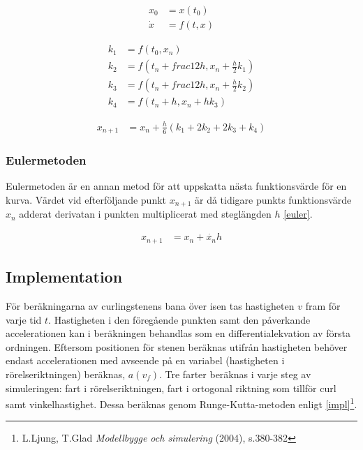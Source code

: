 \documentclass[11pt]{article} %
\begin{document}
 \begin{subequations}
 \begin{align} 
 x_0& = x(t_0)\\ \label{xdot}
 \dot{x}& = f(t,x)
 \end{align}
\end{subequations}

 \begin{subequations}\label{koeff}
 \begin{align}
 k_1& = f(t_0,x_n)\\
 k_2& = f(t_n + frac{1}{2} h, x_n + \frac{h}{2} k_1)\\
 k_3& = f(t_n + frac{1}{2} h, x_n + \frac{h}{2} k_2)\\
 k_4& = f(t_n + h, x_n + h k_3)
 \end{align}
\end{subequations}

 \begin{align}\label{RungeKutta_transl}
 x_{n+1}& =x_n + \frac{h}{6} (k_1+2 k_2 + 2 k_3 + k_4)
 \end{align}

\subsubsection{Eulermetoden}
Eulermetoden är en annan metod för att uppskatta nästa funktionsvärde för en kurva.
Värdet vid efterföljande punkt $x_{n+1}$ är då tidigare punkts funktionsvärde $x_n$ adderat
derivatan i punkten multiplicerat med steglängden $h$ \eqref{euler}.

 \begin{align}\label{euler}
 x_{n+1}& =x_n + \dot{x_n} h
 \end{align}

 \pagebreak

\subsection{Implementation}
För beräkningarna av curlingstenens bana över isen tas hastigheten $v$ fram för varje tid $t$. Hastigheten i den föregående punkten samt den påverkande accelerationen kan i beräkningen behandlas som en differentialekvation av första ordningen. Eftersom positionen för stenen beräknas utifrån hastigheten behöver endast accelerationen med avseende på en variabel (hastigheten i rörelseriktningen) beräknas, $a(v_f)$. Tre farter beräknas i varje steg av simuleringen: fart i rörelseriktningen, fart i ortogonal riktning som tillför curl samt vinkelhastighet. Dessa beräknas genom Runge-Kutta-metoden enligt \eqref{impl}\footnote{L.Ljung, T.Glad \emph{Modellbygge och simulering} (2004), s.380-382}. 
\end{document}
